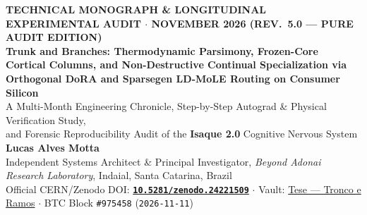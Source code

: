 \documentclass[10pt,a4paper]{article}
\begin{document}
\thispagestyle{empty}
\begin{center}
  {\footnotesize\color{tealaccent}\textbf{TECHNICAL MONOGRAPH \& LONGITUDINAL EXPERIMENTAL AUDIT $\cdot$ NOVEMBER 2026 (REV.\ 5.0 --- PURE AUDIT EDITION)}}\\[6pt]
  {\LARGE\bfseries\color{primary} Trunk and Branches: Thermodynamic Parsimony, Frozen-Core Cortical Columns, and Non-Destructive Continual Specialization via Orthogonal DoRA and Sparsegen LD-MoLE Routing on Consumer Silicon}\\[8pt]
  {\normalsize\color{slate} A Multi-Month Engineering Chronicle, Step-by-Step Autograd \& Physical Verification Study,\\and Forensic Reproducibility Audit of the \textbf{Isaque 2.0} Cognitive Nervous System}\\[10pt]
  {\normalsize\textbf{Lucas Alves Motta} }\\
  {\footnotesize Independent Systems Architect \& Principal Investigator, \textit{Beyond Adonai Research Laboratory}, Indaial, Santa Catarina, Brazil}\\
  {\footnotesize Official CERN/Zenodo DOI: \href{https://doi.org/10.5281/zenodo.24221509}{\textbf{\texttt{10.5281/zenodo.24221509}}} $\cdot$ Vault: \href{https://drive.google.com/drive/folders/1xkl3xJ-djEBjyhXbT3oyg7OfOuUbD1lv}{Tese --- Tronco e Ramos} $\cdot$ BTC Block \texttt{\#975458} (\texttt{2026-11-11})}
\end{center}
\end{document}
